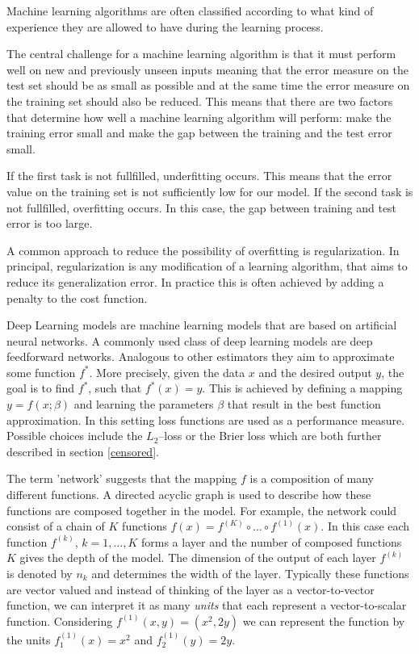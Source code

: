 \documentclass[12pt, a4paper]{scrartcl}
\theoremstyle{definition}
\theoremstyle{plain}
\numberwithin{equation}{section}
\numberwithin{figure}{section}
\numberwithin{table}{section}
\begin{document}
	Machine learning algorithms are often classified according to what kind of experience they are allowed to have during the learning process.

	The central challenge for a machine learning algorithm is that it must perform well on new and previously unseen inputs meaning that the error measure on the test set should be as small as possible and at the same time the error measure on the training set should also be reduced.
	This means that there are two factors that determine how well a machine learning algorithm will perform:
	make the training error small and make the gap between the training and the test error small.
	
	If the first task is not fullfilled, underfitting occurs. This means that the error value on the training set is not sufficiently low for our model.
	If the second task is not fullfilled, overfitting occurs. In this case, the gap between training and test error is too large.
	
	A common approach to reduce the possibility of overfitting is regularization.
	In principal, regularization is any modification of a learning algorithm, that aims to reduce its generalization error.
	In practice this is often achieved by adding a penalty to the cost function.
	
	Deep Learning models are machine learning models that are based on artificial neural networks.
	A commonly used class of deep learning models are deep feedforward networks. Analogous to other estimators they aim to approximate some function $f^*$.
	More precisely, given the data $x$ and the desired output $y$, the goal is to find $f^*$, such that $f^*(x)=y$.
	This is achieved by defining a mapping $y = f(x; \beta)$ and learning the parameters $\beta$ that result in the best function approximation.
	In this setting loss functions are used as a performance measure.
	Possible choices include the $L_2$--loss or the Brier loss which are both further described in section \ref{censored}.
	
	The term 'network' suggests that the mapping $f$ is a composition of many different functions.
	A directed acyclic graph is used to describe how these functions are composed together in the model.
	For example, the network could consist of a chain of $K$ functions $ f(x) = f^{(K)}\circ \dots \circ f^{(1)}(x)$.
	In this case each function $f^{(k)}$, $k=1,\dots,K$ forms a layer and the number of composed functions $K$ gives the depth of the model.
	The dimension of the output of each layer $f^{(k)}$ is denoted by $n_k$ and determines the width of the layer.
	Typically these functions are vector valued and instead of thinking of the layer as a vector-to-vector function, we can interpret it as many \emph{units} that each represent a vector-to-scalar function.
	Considering $f^{(1)}(x,y)= (x^2,2y)$ we can represent the function by the units $f^{(1)}_1 (x) = x^2$ and $f^{(1)}_2(y) = 2y$.
	
\end{document}
